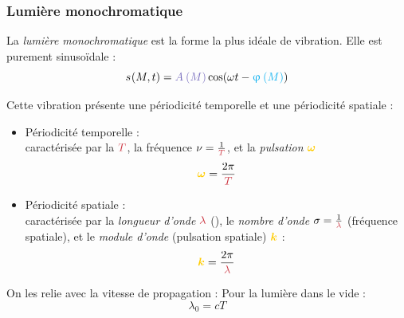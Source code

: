 \documentclass[11pt,a4paper,fleqn,pdftex]{report}
\begin{document}
\subsubsection{Lumière monochromatique} %
\label{ssub:lumiere_monochromatique}
\begin{dfn}
    La \emph{lumière monochromatique} est la forme la plus idéale de vibration. Elle est \og{}purement\fg{} sinusoïdale : 
    \begin{equation}
    \vibration = \amplitude{M} \cos (\pulsation{}t - \phase{M})
    \end{equation}
\end{dfn}
Cette vibration présente une périodicité temporelle et une périodicité spatiale : 
\begin{itemize}
  \item Périodicité temporelle : \\
  caractérisée par la  $\textcolor{couleur4}{T}$, la fréquence $\nu = \frac{1}{\textcolor{couleur4}{T}}$, et la \emph{pulsation} $\textcolor{couleur5}{\boldsymbol{\pulsation}}$
  \[
    \textcolor{couleur5}{\boldsymbol{\pulsation}} = \dfrac{2\pi}{\textcolor{couleur4}{T}}
  \]
  \item Périodicité spatiale : \\
  caractérisée par la \emph{longueur d'onde} $\textcolor{couleur4}{\lambda}$ (), le \emph{nombre d'onde} $\sigma = \frac{1}{\textcolor{couleur4}{\lambda}}$ (fréquence spatiale), et le \emph{module d'onde} (pulsation spatiale) $\textcolor{couleur5}{\boldsymbol{k}}$ :
  \[
    \textcolor{couleur5}{\boldsymbol{k}} = \frac{2\pi}{\textcolor{couleur4}{\lambda}}
  \]
\end{itemize}
On les relie avec la vitesse de propagation : \newline
Pour la lumière dans le vide : 
\begin{equation}
\lambda_0 = c T
\end{equation}
\end{document}
